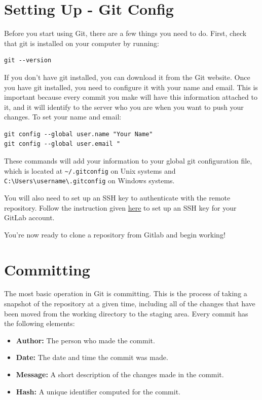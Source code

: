 \documentclass[fleqn]{article}
\begin{document}
\section*{Setting Up - Git Config}

Before you start using Git, there are a few things you need to do. First, check
that git is installed on your computer by running:

\begin{lstlisting}
git --version
\end{lstlisting}

If you don't have git installed, you can download it from the Git website. Once
you have git installed, you need to configure it with your name and email. This
is important because every commit you make will have this information attached
to it, and it will identify to the server who you are when you want to push your
changes. To set your name and email:

\begin{lstlisting}
git config --global user.name "Your Name"
git config --global user.email "
\end{lstlisting}

These commands will add your information to your global git configuration file,
which is located at \texttt{\textasciitilde/.gitconfig} on Unix systems and
\texttt{C:\textbackslash Users\textbackslash username\textbackslash .gitconfig}
on Windows systems.

You will also need to set up an SSH key to authenticate with the remote
repository. Follow the instruction given
\href{https://docs.gitlab.com/ee/user/ssh.html}{here} to set up an SSH key for
your GitLab account.

You're now ready to clone a repository from Gitlab and begin working!

\pagebreak

\section*{Committing}
The most basic operation in Git is committing. This is the process of taking a
snapshot of the repository at a given time, including all of the changes that 
have been moved from the working directory to the staging area. Every commit
has the following elements:

\begin{itemize}
    \item \textbf{Author:} The person who made the commit.
    \item \textbf{Date:} The date and time the commit was made.
    \item \textbf{Message:} A short description of the changes made in the
                            commit.
    \item \textbf{Hash:} A unique identifier computed for the commit.
\end{itemize}
\end{document}
